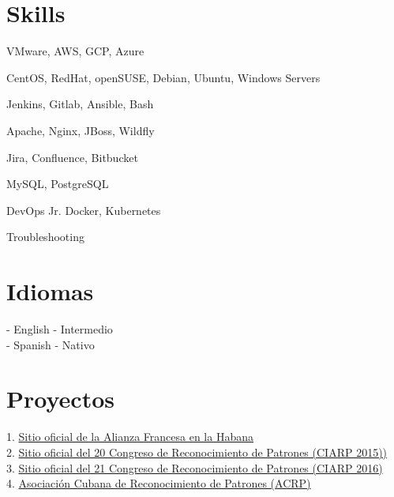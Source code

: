 \documentclass[a4paper,10pt]{article}
\begin{document}
\section{Skills}
\justify
\begin{enumerate*}
	\item VMware, AWS, GCP, Azure \hspace{0.15cm}
	\item CentOS, RedHat, openSUSE, Debian, Ubuntu, Windows Servers \hspace{0.15cm}
	\item Jenkins, Gitlab, Ansible, Bash \hspace{0.15cm}
	\item Apache, Nginx, JBoss,  Wildfly \hspace{0.15cm}
	\item Jira, Confluence, Bitbucket \hspace{0.15cm}
	\item MySQL, PostgreSQL \hspace{0.15cm}
	\item DevOps Jr. Docker, Kubernetes \hspace{0.15cm}
	\item Troubleshooting
\end{enumerate*}

\section{Idiomas}
\justify
- English - Intermedio\\
- Spanish - Nativo

\section{Proyectos}
\justify

1. \href{http://ecolehavane.org}{Sitio oficial de la Alianza Francesa en la Habana} \\
2. \href{http://www.ciarp.org/xx}{Sitio oficial del 20 Congreso de Reconocimiento de Patrones (CIARP 2015))}\\
3. \href{http://www.ciarp.org/xxi}{Sitio oficial del 21 Congreso de Reconocimiento de Patrones (CIARP 2016)} \\
4. \href{http://acrp.cenatav.co.cu}{Asociaci\'on Cubana de Reconocimiento de Patrones (ACRP)} \\
\end{document}
